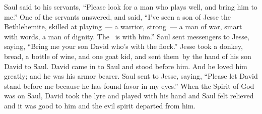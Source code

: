 \begin{inparaenum}
   Saul said to his servants, ``Please look for a man who plays well, and bring him to me.''%
   One of the servants answered, and said, ``I've seen a son of Jesse the Bethlehemite, skilled at playing~--- a warrior, strong~--- a man of war, smart with words, a man of dignity. The \lord\ is with him.''%
   Saul sent messengers to Jesse, saying, ``Bring me your son David who's with the flock.''%
   Jesse took a donkey, bread, a bottle of wine, and one goat kid, and sent them\understood\ by the hand of his son David to Saul.%
   David came in to Saul and stood before him. And he loved him greatly; and he was his armor bearer.%
   Saul sent to Jesse, saying, ``Please let David stand before me because he has found favor in my eyes.''%
   When the Spirit of God was on Saul, David took the lyre and played with his hand and Saul felt relieved and it was good to him and the evil spirit departed from him.%
\end{inparaenum}
